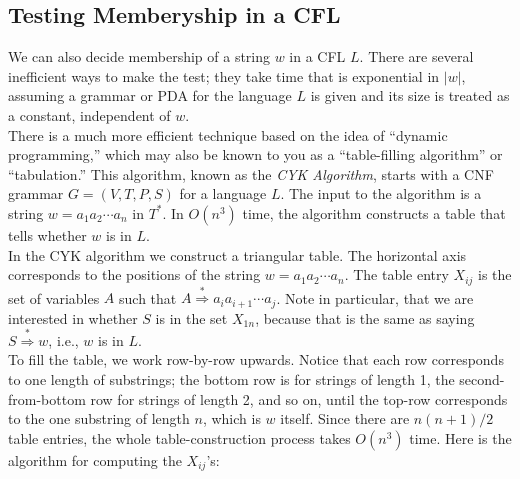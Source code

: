 \documentclass[]{article}
\begin{document}
  \subsection*{Testing Memberyship in a CFL}
    We can also decide membership of a string $w$ in a CFL $L$. There are
    several inefficient ways to make the test; they take time that is
    exponential in $|w|$, assuming a grammar or PDA for the language $L$ is
    given and its size is treated as a constant, independent of $w$. \\
    \indent There is a much more efficient technique based on the idea of
    ``dynamic programming,'' which may also be known to you as a ``table-filling
    algorithm'' or ``tabulation.'' This algorithm, known as the \emph{CYK
    Algorithm}, starts with a CNF grammar $G = (V,T,P,S)$ for a language $L$.
    The input to the algorithm is a string $w = a_1a_2\cdots a_n$ in $T^*$. In
    $O(n^3)$ time, the algorithm constructs a table that tells whether $w$ is in
    $L$. \\
    \indent In the CYK algorithm we construct a triangular table. The horizontal
    axis corresponds to the positions of the string $w = a_1a_2\cdots a_n$. The
    table entry $X_{ij}$ is the set of variables $A$ such that $A \overset{*}
    {\Rightarrow} a_ia_{i + 1} \cdots a_j$. Note in particular, that we are
    interested in whether $S$ is in the set $X_{1n}$, because that is the same
    as saying $S \overset{*}{\Rightarrow} w$, i.e., $w$ is in $L$. \\
    \indent To fill the table, we work row-by-row upwards. Notice that each row
    corresponds to one length of substrings; the bottom row is for strings of
    length 1, the second-from-bottom row for strings of length 2, and so on,
    until the top-row corresponds to the one substring of length $n$, which is
    $w$ itself. Since there are $n(n+1)/2$ table entries, the whole
    table-construction process takes $O(n^3)$ time. Here is the algorithm for
    computing the $X_{ij}$'s:
\end{document}
